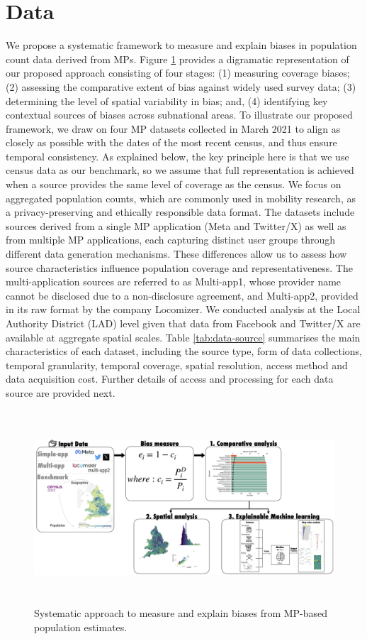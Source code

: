 \documentclass{article}
\begin{document}
\section{Data}\label{sec-data}

We propose a systematic framework to measure and explain biases in
population count data derived from MPs. Figure
\ref{fig:debias-approach} provides a digramatic representation of our
proposed approach consisting of four stages: (1) measuring coverage
biases; (2) assessing the comparative extent of bias against widely used
survey data; (3) determining the level of spatial variability in bias;
and, (4) identifying key contextual sources of biases across subnational
areas. To illustrate our proposed framework, we draw on four MP datasets
collected in March 2021 to align as closely as possible with the dates
of the most recent census, and thus ensure temporal consistency. As
explained below, the key principle here is that we use census data as
our benchmark, so we assume that full representation is achieved when a
source provides the same level of coverage as the census. We focus on
aggregated population counts, which are commonly used in mobility
research, as a privacy-preserving and ethically responsible data format.
The datasets include sources derived from a single MP application (Meta
and Twitter/X) as well as from multiple MP applications, each capturing
distinct user groups through different data generation mechanisms. These
differences allow us to assess how source characteristics influence
population coverage and representativeness. The multi-application
sources are referred to as Multi-app1, whose provider name cannot be
disclosed due to a non-disclosure agreement, and Multi-app2, provided in
its raw format by the company Locomizer. We conducted analysis at the
Local Authority District (LAD) level given that data from Facebook and
Twitter/X are available at aggregate spatial scales. Table
\ref{tab:data-source} summarises the main characteristics of each
dataset, including the source type, form of data collections, temporal
granularity, temporal coverage, spatial resolution, access method and
data acquisition cost. Further details of access and processing for each
data source are provided next.

\begin{figure}
\centering
\includegraphics[width=14.5cm,height=7.2cm]{figures/debias-approach.png}
\caption{Systematic approach to measure and explain biases from MP-based
population estimates.}\label{fig:debias-approach}
\end{figure}
\end{document}

